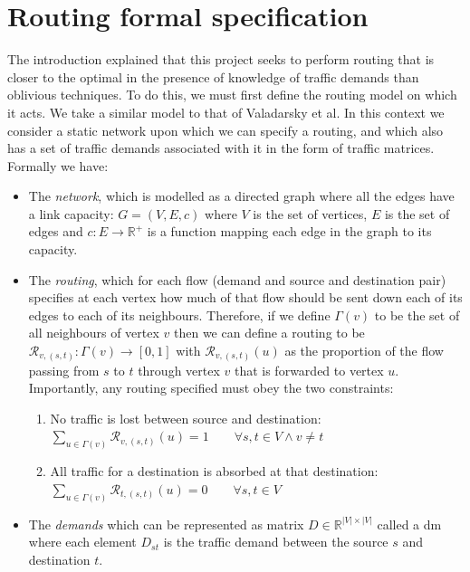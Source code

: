 \section{Routing formal specification}
\label{section:routing}
The introduction explained that this project seeks to perform routing that is closer to the optimal in the presence of knowledge of traffic demands than oblivious techniques. To do this, we must first define the routing model on which it acts. We take a similar model to that of Valadarsky et al. In this context we consider a static network upon which we can specify a routing, and which also has a set of traffic demands associated with it in the form of traffic matrices. Formally we have:
\begin{itemize}
  \item The \emph{network}, which is modelled as a directed graph where all the edges have a link capacity: $G=(V,E,c)$ where $V$ is the set of vertices, $E$ is the set of edges and $c : E \rightarrow \mathbb{R}^+$ is a function mapping each edge in the graph to its capacity.
  \item The \emph{routing}, which for each flow (demand and source and destination pair) specifies at each vertex how much of that flow should be sent down each of its edges to each of its neighbours. Therefore, if we define $\Gamma(v)$ to be the set of all neighbours of vertex $v$ then we can define a routing to be $\mathcal{R}_{v,(s,t)} : \Gamma(v) \rightarrow [0,1]$ with $\mathcal{R}_{v,(s,t)}(u)$ as the proportion of the flow passing from $s$ to $t$ through vertex $v$ that is forwarded to vertex $u$. Importantly, any routing specified must obey the two constraints:
    \begin{enumerate}
      \item No traffic is lost between source and destination:\\
        $\sum_{u \in \Gamma(v)}{\mathcal{R}_{v,(s,t)}(u)} = 1 \qquad \forall s, t \in V \wedge v \neq t$
      \item All traffic for a destination is absorbed at that destination:\\
        $\sum_{u \in \Gamma(v)}{\mathcal{R}_{t,(s,t)}(u)} = 0 \qquad \forall s, t \in V$
    \end{enumerate}
  \item The \emph{demands} which can be represented as matrix $D \in \mathbb{R}^{|V|\times|V|}$ called a \ac{dm} where each element $D_{st}$ is the traffic demand between the source $s$ and destination $t$.
\end{itemize}

